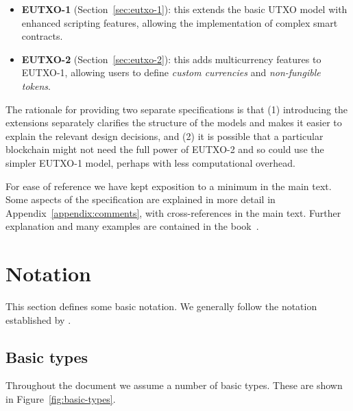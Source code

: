 \documentclass[a4paper]{article}
\begin{document}
\begin{itemize}
  \item \textbf{EUTXO-1} (Section~\ref{sec:eutxo-1}): this extends the
    basic UTXO model with enhanced scripting features, allowing the
    implementation of complex smart contracts.
  \item \textbf{EUTXO-2} (Section~\ref{sec:eutxo-2}): this adds
    multicurrency features to EUTXO-1, allowing users to define
    \textit{custom currencies} and \textit{non-fungible tokens}.
\end{itemize}


\medskip

The rationale for providing two separate specifications is that (1)
introducing the extensions separately clarifies the structure of the
models and makes it easier to explain the relevant design decisions,
and (2) it is possible that a particular blockchain might not need the
full power of EUTXO-2 and so could use the simpler EUTXO-1 model,
perhaps with less computational overhead.

\medskip

For ease of reference we have kept exposition to a minimum in the main
text.  Some aspects of the specification are explained in more detail
in Appendix~\ref{appendix:comments}, with cross-references in the main
text.  Further explanation and many examples are contained in the
book~\citep{Plutus-book}.


\section{Notation}
This section defines some basic notation.  We generally follow the
notation established by \citep{Zahnentferner18-UTxO}.

\subsection{Basic types}
\noindent Throughout the document we assume a number of basic types.
These are shown in Figure~\ref{fig:basic-types}.
\end{document}
